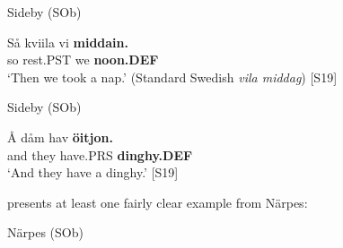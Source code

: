 
\item 

Sideby (SOb)



 \ea\label{}
\gll Så  kviila  vi  \textbf{middain.} \\


so  rest.PST  we  \textbf{noon.DEF} \\

\glt ‘Then we took a nap.’ (Standard Swedish \textit{vila middag}) [S19]

\z

\item 

Sideby (SOb)



 \ea\label{}
\gll Å  dåm  hav  \textbf{öitjon.}\\


and  they  have.PRS  \textbf{dinghy.DEF}\\

\glt ‘And they have a dinghy.’ [S19]

\z

\citet{Ivars2005} presents at least one fairly clear example from Närpes:


\item 

Närpes (SOb)



